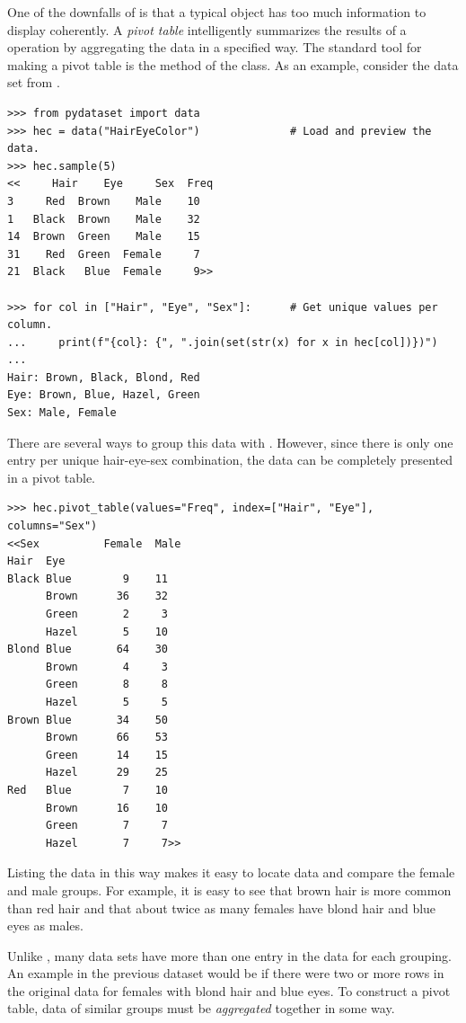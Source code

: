One of the downfalls of  is that a typical  object has too much information to display coherently.
A \emph{pivot table} intelligently summarizes the results of a  operation by aggregating the data in a specified way.
The standard tool for making a pivot table is the  method of the  class.
As an example, consider the  data set from .

\begin{lstlisting}
>>> from pydataset import data
>>> hec = data("HairEyeColor")              # Load and preview the data.
>>> hec.sample(5)
<<     Hair    Eye     Sex  Freq
3     Red  Brown    Male    10
1   Black  Brown    Male    32
14  Brown  Green    Male    15
31    Red  Green  Female     7
21  Black   Blue  Female     9>>

>>> for col in ["Hair", "Eye", "Sex"]:      # Get unique values per column.
...     print(f"{col}: {", ".join(set(str(x) for x in hec[col])})")
...
Hair: Brown, Black, Blond, Red
Eye: Brown, Blue, Hazel, Green
Sex: Male, Female
\end{lstlisting}

There are several ways to group this data with .
However, since there is only one entry per unique hair-eye-sex combination, the data can be completely presented in a pivot table.

\begin{lstlisting}
>>> hec.pivot_table(values="Freq", index=["Hair", "Eye"], columns="Sex")
<<Sex          Female  Male
Hair  Eye
Black Blue        9    11
      Brown      36    32
      Green       2     3
      Hazel       5    10
Blond Blue       64    30
      Brown       4     3
      Green       8     8
      Hazel       5     5
Brown Blue       34    50
      Brown      66    53
      Green      14    15
      Hazel      29    25
Red   Blue        7    10
      Brown      16    10
      Green       7     7
      Hazel       7     7>>
\end{lstlisting}

Listing the data in this way makes it easy to locate data and compare the female and male groups.
For example, it is easy to see that brown hair is more common than red hair and that about twice as many females have blond hair and blue eyes as males.

Unlike , many data sets have more than one entry in the data for each grouping.
An example in the previous dataset would be if there were two or more rows in the original data for females with blond hair and blue eyes.
To construct a pivot table, data of similar groups must be \emph{aggregated} together in some way.


